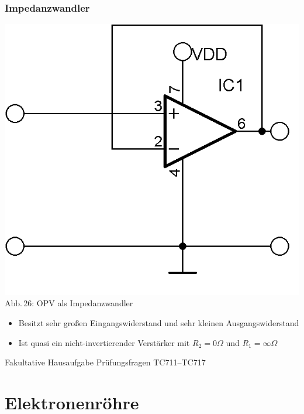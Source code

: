 \begin{frame}
  \frametitle{Impedanzwandler}
  \begin{minipage}{0.4\textwidth}
    \begin{center}
      \includegraphics[width=\textwidth,height=.85\textheight,keepaspectratio]{a06/Impedanzwandler.png}\\
      {\tiny Abb.\,26: OPV als Impedanzwandler}
    \end{center}
  \end{minipage}
  \begin{minipage}{0.5\textwidth}
    \begin{itemize}
      \item Besitzt sehr großen Eingangswiderstand und sehr kleinen Ausgangswiderstand
      \item Ist quasi ein nicht-invertierender Verstärker mit $R_2 = 0 \Omega$ und $R_1 = \infty\Omega$
    \end{itemize}
  \end{minipage}
\end{frame}


\begin{frame}
  \begin{exampleblock}{Fakultative Hausaufgabe}
    Prüfungsfragen TC711--TC717
  \end{exampleblock}
\end{frame}

\section*{Elektronenröhre}

